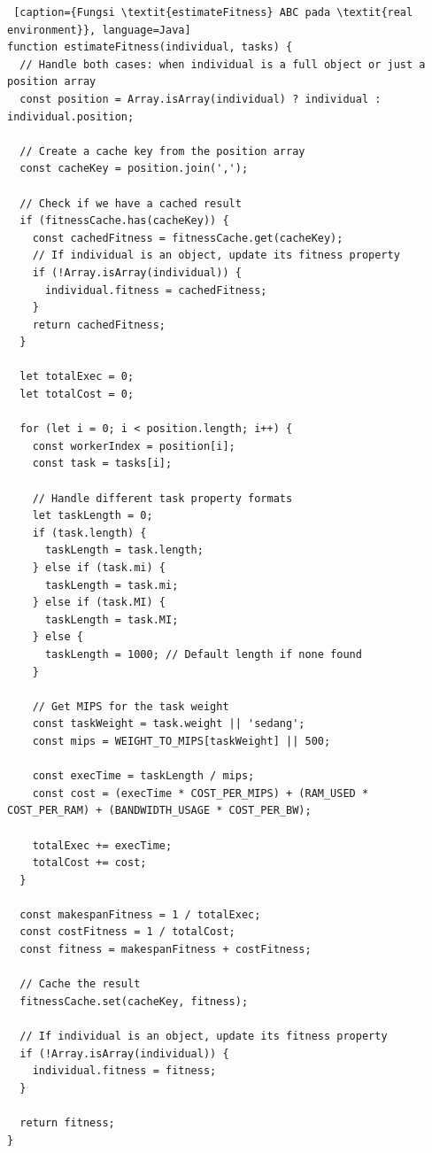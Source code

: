 \begin{lstlisting} [caption={Fungsi \textit{estimateFitness} ABC pada \textit{real environment}}, language=Java]
function estimateFitness(individual, tasks) {
  // Handle both cases: when individual is a full object or just a position array
  const position = Array.isArray(individual) ? individual : individual.position;
  
  // Create a cache key from the position array
  const cacheKey = position.join(',');
  
  // Check if we have a cached result
  if (fitnessCache.has(cacheKey)) {
    const cachedFitness = fitnessCache.get(cacheKey);
    // If individual is an object, update its fitness property
    if (!Array.isArray(individual)) {
      individual.fitness = cachedFitness;
    }
    return cachedFitness;
  }
  
  let totalExec = 0;
  let totalCost = 0;

  for (let i = 0; i < position.length; i++) {
    const workerIndex = position[i];
    const task = tasks[i];
    
    // Handle different task property formats
    let taskLength = 0;
    if (task.length) {
      taskLength = task.length;
    } else if (task.mi) {
      taskLength = task.mi;
    } else if (task.MI) {
      taskLength = task.MI;
    } else {
      taskLength = 1000; // Default length if none found
    }
    
    // Get MIPS for the task weight
    const taskWeight = task.weight || 'sedang';
    const mips = WEIGHT_TO_MIPS[taskWeight] || 500;

    const execTime = taskLength / mips;
    const cost = (execTime * COST_PER_MIPS) + (RAM_USED * COST_PER_RAM) + (BANDWIDTH_USAGE * COST_PER_BW);

    totalExec += execTime;
    totalCost += cost;
  }

  const makespanFitness = 1 / totalExec;
  const costFitness = 1 / totalCost;
  const fitness = makespanFitness + costFitness;
  
  // Cache the result
  fitnessCache.set(cacheKey, fitness);
  
  // If individual is an object, update its fitness property
  if (!Array.isArray(individual)) {
    individual.fitness = fitness;
  }
  
  return fitness;
}
\end{lstlisting}

